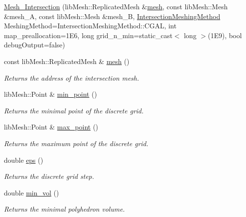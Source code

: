 \begin{DoxyCompactItemize}
\item 
\hyperlink{classcarl_1_1_mesh___intersection_a1be516661baed2caf09d3bf5091850e6}{Mesh\+\_\+\+Intersection} (lib\+Mesh\+::\+Replicated\+Mesh \&\hyperlink{classcarl_1_1_mesh___intersection_a7135c4c2e57e5ccdfbe5cd3286103460}{mesh}, const lib\+Mesh\+::\+Mesh \&mesh\+\_\+\+A, const lib\+Mesh\+::\+Mesh \&mesh\+\_\+\+B, \hyperlink{namespacecarl_a4f72fd25137b97ac1ca1276ec549e5cf}{Intersection\+Meshing\+Method} Meshing\+Method=Intersection\+Meshing\+Method\+::\+C\+G\+A\+L, int map\+\_\+preallocation=1\+E6, long grid\+\_\+n\+\_\+min=static\+\_\+cast$<$ long $>$(1\+E9), bool debug\+Output=false)
\item 
const lib\+Mesh\+::\+Replicated\+Mesh \& \hyperlink{classcarl_1_1_mesh___intersection_a7135c4c2e57e5ccdfbe5cd3286103460}{mesh} ()
\begin{DoxyCompactList}\small\item\em Returns the address of the intersection mesh. \end{DoxyCompactList}\item 
lib\+Mesh\+::\+Point \& \hyperlink{classcarl_1_1_mesh___intersection_a84e2ce5be9a9eeb53671ee6d8a8622ef}{min\+\_\+point} ()
\begin{DoxyCompactList}\small\item\em Returns the minimal point of the discrete grid. \end{DoxyCompactList}\item 
lib\+Mesh\+::\+Point \& \hyperlink{classcarl_1_1_mesh___intersection_a9ea043113a1437906da1319e50632d69}{max\+\_\+point} ()
\begin{DoxyCompactList}\small\item\em Returns the maximum point of the discrete grid. \end{DoxyCompactList}\item 
double \hyperlink{classcarl_1_1_mesh___intersection_ace09b471c9d37dd0b41f0533907e78b7}{eps} ()
\begin{DoxyCompactList}\small\item\em Returns the discrete grid step. \end{DoxyCompactList}\item 
double \hyperlink{classcarl_1_1_mesh___intersection_acfc4b6aae06fa27ea0cebcf7e112381a}{min\+\_\+vol} ()
\begin{DoxyCompactList}\small\item\em Returns the minimal polyhedron volume. \end{DoxyCompactList}\item 

\end{DoxyCompactItemize}
